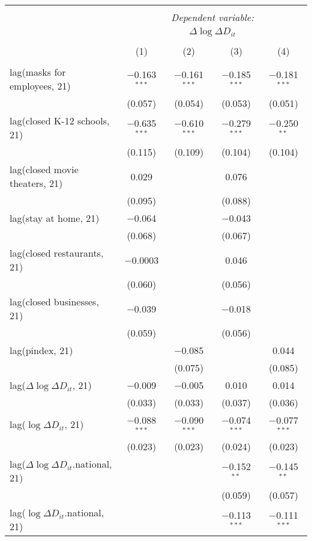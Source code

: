 \begin{tabular}{@{\extracolsep{1pt}}lcccc} 
\\[-1.8ex]\hline 
\hline \\[-1.8ex] 
 & \multicolumn{4}{c}{\textit{Dependent variable:}} \\ 
\cline{2-5} 
 & \multicolumn{4}{c}{$\Delta \log \Delta D_{it}$} \\ 
\\[-1.8ex] & (1) & (2) & (3) & (4)\\ 
\hline \\[-1.8ex] 
 lag(masks for employees, 21) & $-$0.163$^{***}$ & $-$0.161$^{***}$ & $-$0.185$^{***}$ & $-$0.181$^{***}$ \\ 
  & (0.057) & (0.054) & (0.053) & (0.051) \\ 
  lag(closed K-12 schools, 21) & $-$0.635$^{***}$ & $-$0.610$^{***}$ & $-$0.279$^{***}$ & $-$0.250$^{**}$ \\ 
  & (0.115) & (0.109) & (0.104) & (0.104) \\ 
  lag(closed movie theaters, 21) & 0.029 &  & 0.076 &  \\ 
  & (0.095) &  & (0.088) &  \\ 
  lag(stay at home, 21) & $-$0.064 &  & $-$0.043 &  \\ 
  & (0.068) &  & (0.067) &  \\ 
  lag(closed restaurants, 21) & $-$0.0003 &  & 0.046 &  \\ 
  & (0.060) &  & (0.056) &  \\ 
  lag(closed businesses, 21) & $-$0.039 &  & $-$0.018 &  \\ 
  & (0.059) &  & (0.056) &  \\ 
  lag(pindex, 21) &  & $-$0.085 &  & 0.044 \\ 
  &  & (0.075) &  & (0.085) \\ 
  lag($\Delta \log \Delta D_{it}$, 21) & $-$0.009 & $-$0.005 & 0.010 & 0.014 \\ 
  & (0.033) & (0.033) & (0.037) & (0.036) \\ 
  lag($\log \Delta D_{it}$, 21) & $-$0.088$^{***}$ & $-$0.090$^{***}$ & $-$0.074$^{***}$ & $-$0.077$^{***}$ \\ 
  & (0.023) & (0.023) & (0.024) & (0.023) \\ 
  lag($\Delta \log \Delta D_{it}$.national, 21) &  &  & $-$0.152$^{**}$ & $-$0.145$^{**}$ \\ 
  &  &  & (0.059) & (0.057) \\ 
  lag($\log \Delta D_{it}$.national, 21) &  &  & $-$0.113$^{***}$ & $-$0.111$^{***}$ \\ 

\end{tabular}
